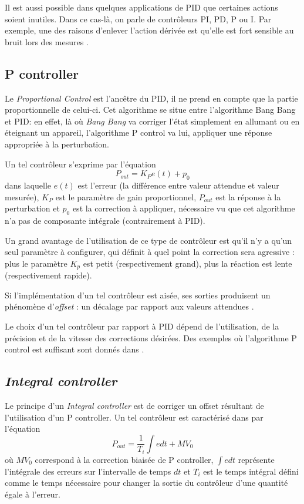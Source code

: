 \documentclass[a4paper,10pt]{report}
\begin{document}
Il est aussi possible dans quelques applications de PID que certaines actions soient inutiles.
Dans ce cas-là, on parle de contrôleurs PI, PD, P ou I.
Par exemple, une des raisons d'enlever l'action dérivée est qu'elle est fort sensible au bruit lors des mesures \cite{svrcek2014real}.

\subsection{P controller}
Le \emph{Proportional Control} est l'ancêtre du PID, il ne prend en compte que la partie proportionnelle de celui-ci.
Cet algorithme se situe entre l'algorithme Bang Bang et PID:
en effet, là où \emph{Bang Bang} va corriger l'état simplement en allumant ou en éteignant un appareil, l'algorithme P control va lui, appliquer une réponse appropriée à la perturbation.

Un tel contrôleur s'exprime par l'équation
\begin{equation}P_{out} = K_{P}e(t) + p_0\end{equation}
dans laquelle $e(t)$ est l'erreur (la différence entre valeur attendue et valeur mesurée), $K_{P}$ est le paramètre de gain proportionnel, $P_{out}$ est la réponse à la perturbation et $p_0$ est la correction à appliquer, nécessaire vu que cet algorithme n'a pas de composante intégrale (contrairement à PID).

Un grand avantage de l'utilisation de ce type de contrôleur est qu'il n'y a qu'un seul paramètre à configurer, qui définit à quel point la correction sera agressive : plus le paramètre $K_{p}$ est petit (respectivement grand), plus la réaction est lente (respectivement rapide).

Si l'implémentation d'un tel contrôleur est aisée, ses sorties produisent un phénomène d'\emph{offset} : un décalage par rapport aux valeurs attendues \cite{svrcek2014real}.

Le choix d'un tel contrôleur par rapport à PID dépend de l'utilisation, de la précision et de la vitesse des corrections désirées.
Des exemples où l'algorithme P control est suffisant sont donnés dans \cite{sellers2001overview}.

\subsection{\emph{Integral controller}}
Le principe d'un \emph{Integral controller} est de corriger un offset résultant de l'utilisation d'un P controller.
Un tel contrôleur est caractérisé dans \cite{svrcek2014real} par l'équation
\begin{equation}P_{out} = \frac{1}{T_{i}}\int e dt + MV_{0}\end{equation}
où $MV_{0}$ correspond à la correction biaisée de P controller,
$\int e dt$ représente l'intégrale des erreurs sur l'intervalle de temps $dt$ et $T_{i}$ est le temps intégral défini comme le temps nécessaire pour changer la sortie du contrôleur d'une quantité égale à l'erreur.
\end{document}
